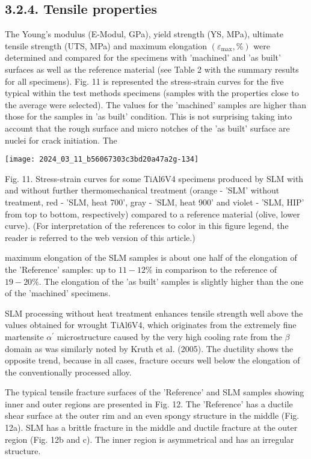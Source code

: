 \documentclass[10pt]{article}
\begin{document}
\subsection*{3.2.4. Tensile properties}
The Young's modulus (E-Modul, GPa), yield strength (YS, MPa), ultimate tensile strength (UTS, MPa) and maximum elongation $\left(\varepsilon_{\max }, \%\right)$ were determined and compared for the specimens with 'machined' and 'as built' surfaces as well as the reference material (see Table 2 with the summary results for all specimens). Fig. 11 is represented the stress-strain curves for the five typical within the test methods specimens (samples with the properties close to the average were selected). The values for the 'machined' samples are higher than those for the samples in 'as built' condition. This is not surprising taking into account that the rough surface and micro notches of the 'as built' surface are nuclei for crack initiation. The

\begin{center}
\texttt{[image: 2024\_03\_11\_b56067303c3bd20a47a2g-134]}
\end{center}

Fig. 11. Stress-strain curves for some TiAl6V4 specimens produced by SLM with and without further thermomechanical treatment (orange - 'SLM' without treatment, red - 'SLM, heat 700', gray - 'SLM, heat 900' and violet - 'SLM, HIP' from top to bottom, respectively) compared to a reference material (olive, lower curve). (For interpretation of the references to color in this figure legend, the reader is referred to the web version of this article.)

maximum elongation of the SLM samples is about one half of the elongation of the 'Reference' samples: up to $11-12 \%$ in comparison to the reference of $19-20 \%$. The elongation of the 'as built' samples is slightly higher than the one of the 'machined' specimens.

SLM processing without heat treatment enhances tensile strength well above the values obtained for wrought TiAl6V4, which originates from the extremely fine martensite $\alpha^{\prime}$ microstructure caused by the very high cooling rate from the $\beta$ domain as was similarly noted by Kruth et al. (2005). The ductility shows the opposite trend, because in all cases, fracture occurs well below the elongation of the conventionally processed alloy.

The typical tensile fracture surfaces of the 'Reference' and SLM samples showing inner and outer regions are presented in Fig. 12. The 'Reference' has a ductile shear surface at the outer rim and an even spongy structure in the middle (Fig. 12a). SLM has a brittle fracture in the middle and ductile fracture at the outer region (Fig. 12b and c). The inner region is asymmetrical and has an irregular structure.
\end{document}
